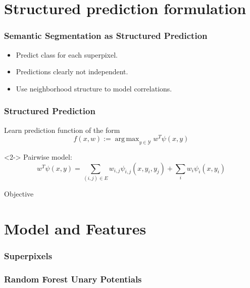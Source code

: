 \documentclass[final,ignorenonframetext,compress]{beamer}
\DeclareMathOperator*{\argmax}{arg\,max}
\begin{document}
    \section{Structured prediction formulation}

    \begin{frame}
        \frametitle{Semantic Segmentation as Structured Prediction}
        \vspace{-5mm}
        \begin{itemize}
            \item<1->Predict class for each superpixel.
            \item<2->Predictions clearly not independent.
            \item<3->Use neighborhood structure to model correlations.
        \end{itemize}
    \end{frame}

    \begin{frame}
        \frametitle{Structured Prediction}
        Learn prediction function of the form
        \[f(x, w) := \argmax_{y \in \mathcal{Y}}  w^T \psi(x, y) \]
        \begin{visibleenv}<2->
            Pairwise model:
            \[w^T \psi(x, y) = \sum_{(i, j) \in E} w_{i,j} \psi_{i,j}(x, y_i, y_j) + \sum_i w_i \psi_i(x, y_i)\]
        \end{visibleenv}
        Objective
    \end{frame}

    \section{Model and Features}
    \begin{frame}
        \frametitle{Superpixels}
    \end{frame}

    \begin{frame}
        \frametitle{Random Forest Unary Potentials}
    \end{frame}
\end{document}
